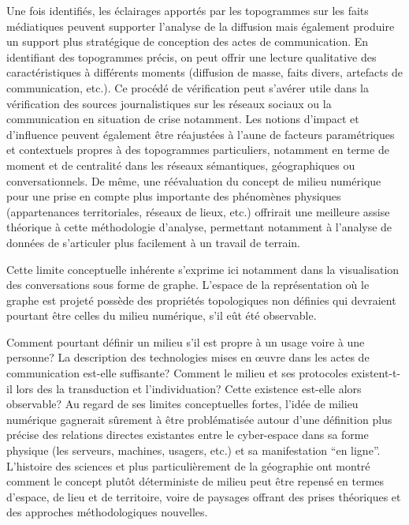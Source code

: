 Une fois identifiés, les éclairages apportés par les topogrammes sur les faits médiatiques peuvent supporter l{\textquoteright}analyse de la diffusion mais également produire un support plus stratégique de conception des actes de communication. En identifiant des topogrammes précis, on peut offrir une lecture qualitative des caractéristiques à différents moments (diffusion de masse, faits divers, artefacts de communication, etc.). Ce procédé de vérification peut s{\textquoteright}avérer utile dans la vérification des sources journalistiques sur les réseaux sociaux ou la communication en situation de crise notamment. Les notions d{\textquoteright}impact et d{\textquoteright}influence peuvent également être réajustées à l{\textquoteright}aune de facteurs paramétriques et contextuels propres à des topogrammes particuliers, notamment en terme de moment et de centralité dans les réseaux sémantiques, géographiques ou conversationnels. De même, une réévaluation du concept de milieu numérique pour une prise en compte plus importante des phénomènes physiques (appartenances territoriales, réseaux de lieux, etc.) offrirait une meilleure assise théorique à cette méthodologie d{\textquoteright}analyse, permettant notamment à l{\textquoteright}analyse de données de s'articuler plus facilement à un travail de terrain. 

Cette limite conceptuelle inhérente s{\textquoteright}exprime ici notamment dans la visualisation des conversations sous forme de graphe. L'espace de la représentation où le graphe est projeté possède des propriétés topologiques non définies qui devraient pourtant être celles du milieu numérique, s'il eût été observable. 

Comment pourtant définir un milieu s{\textquoteright}il est propre à un usage voire à une personne? La description des technologies mises en {\oe}uvre dans les actes de communication est-elle suffisante? Comment le milieu et ses protocoles existent-t-il lors des la transduction et l{\textquoteright}individuation? Cette existence est-elle alors observable? Au regard de ses limites conceptuelles fortes, l{\textquoteright}idée de milieu numérique gagnerait s\^urement à être problématisée autour d{\textquoteright}une définition plus précise des relations directes existantes entre le cyber-espace dans sa forme physique (les serveurs, machines, usagers, etc.) et sa manifestation {\textquotedblleft}en ligne{\textquotedblright}. L{\textquoteright}histoire des sciences et plus particulièrement de la géographie ont montré comment le concept plut\^ot déterministe de milieu peut être repensé en termes d{\textquoteright}espace, de lieu et de territoire, voire de paysages offrant des prises théoriques et des approches méthodologiques nouvelles. 

